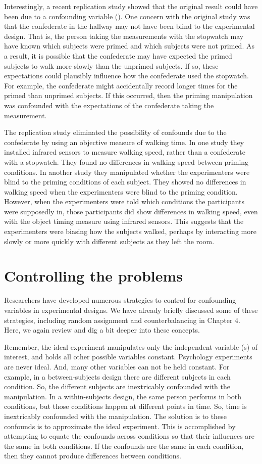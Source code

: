 Interestingly, a recent replication study showed that the original result could have been due to a confounding variable (). One concern with the original study was that the confederate in the hallway may not have been blind to the experimental design. That is, the person taking the measurements with the stopwatch may have known which subjects were primed and which subjects were not primed. As a result, it is possible that the confederate may have expected the primed subjects to walk more slowly than the unprimed subjects. If so, these expectations could plausibly influence how the confederate used the stopwatch. For example, the confederate might accidentally record longer times for the primed than unprimed subjects. If this occurred, then the priming manipulation was confounded with the expectations of the confederate taking the measurement.

The replication study eliminated the possibility of confounds due to the confederate by using an objective measure of walking time. In one study they installed infrared sensors to measure walking speed, rather than a confederate with a stopwatch. They found no differences in walking speed between priming conditions. In another study they manipulated whether the experimenters were blind to the priming conditions of each subject. They showed no differences in walking speed when the experimenters were blind to the priming condition. However, when the experimenters were told which conditions the participants were supposedly in, those participants did show differences in walking speed, even with the object timing measure using infrared sensors. This suggests that the experimenters were biasing how the subjects walked, perhaps by interacting more slowly or more quickly with different subjects as they left the room.

\section{Controlling the problems}

Researchers have developed numerous strategies to control for confounding variables in experimental designs. We have already briefly discussed some of these strategies, including random assignment and counterbalancing in Chapter 4. Here, we again review and dig a bit deeper into these concepts.

Remember, the ideal experiment manipulates only the independent variable (s) of interest, and holds all other possible variables constant. Psychology experiments are never ideal. And, many other variables can not be held constant. For example, in a between-subjects design there are different subjects in each condition. So, the different subjects are inextricably confounded with the manipulation. In a within-subjects design, the same person performs in both conditions, but those conditions happen at different points in time. So, time is inextricably confounded with the manipulation. The solution is to these confounds is to approximate the ideal experiment. This is accomplished by attempting to equate the confounds across conditions so that their influences are the same in both conditions. If the confounds are the same in each condition, then they cannot produce differences between conditions.

